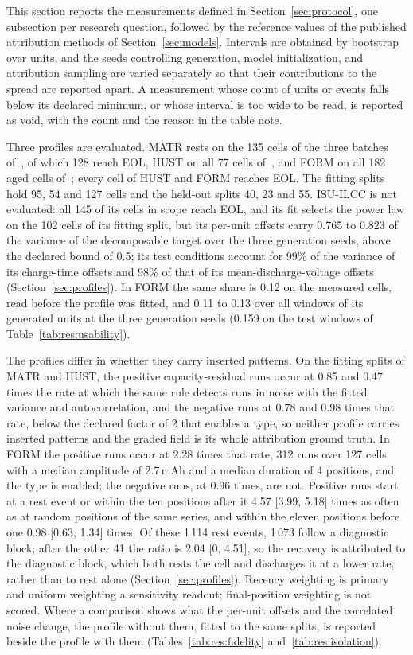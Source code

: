 \documentclass{article}
\begin{document}
This section reports the measurements defined in Section~\ref{sec:protocol}, one subsection per research question, followed by the reference values of the published attribution methods of Section~\ref{sec:models}. Intervals are obtained by bootstrap over units, and the seeds controlling generation, model initialization, and attribution sampling are varied separately so that their contributions to the spread are reported apart. A measurement whose count of units or events falls below its declared minimum, or whose interval is too wide to be read, is reported as void, with the count and the reason in the table note.

Three profiles are evaluated. MATR rests on the 135 cells of the three batches of~\cite{severson2019}, of which 128 reach EOL, HUST on all 77 cells of~\cite{ma2022hust}, and FORM on all 182 aged cells of~\cite{cui2024formation}; every cell of HUST and FORM reaches EOL. The fitting splits hold 95, 54 and 127 cells and the held-out splits 40, 23 and 55. ISU-ILCC is not evaluated: all 145 of its cells in scope reach EOL, and its fit selects the power law on the 102 cells of its fitting split, but its per-unit offsets carry 0.765 to 0.823 of the variance of the decomposable target over the three generation seeds, above the declared bound of 0.5; its test conditions account for 99\% of the variance of its charge-time offsets and 98\% of that of its mean-discharge-voltage offsets (Section~\ref{sec:profiles}). In FORM the same share is 0.12 on the measured cells, read before the profile was fitted, and 0.11 to 0.13 over all windows of its generated units at the three generation seeds (0.159 on the test windows of Table~\ref{tab:res:usability}).

The profiles differ in whether they carry inserted patterns. On the fitting splits of MATR and HUST, the positive capacity-residual runs occur at 0.85 and 0.47 times the rate at which the same rule detects runs in noise with the fitted variance and autocorrelation, and the negative runs at 0.78 and 0.98 times that rate, below the declared factor of 2 that enables a type, so neither profile carries inserted patterns and the graded field is its whole attribution ground truth. In FORM the positive runs occur at 2.28 times that rate, 312 runs over 127 cells with a median amplitude of 2.7\,mAh and a median duration of 4 positions, and the type is enabled; the negative runs, at 0.96 times, are not. Positive runs start at a rest event or within the ten positions after it 4.57 [3.99, 5.18] times as often as at random positions of the same series, and within the eleven positions before one 0.98 [0.63, 1.34] times. Of these 1\,114 rest events, 1\,073 follow a diagnostic block; after the other 41 the ratio is 2.04 [0, 4.51], so the recovery is attributed to the diagnostic block, which both rests the cell and discharges it at a lower rate, rather than to rest alone (Section~\ref{sec:profiles}). Recency weighting is primary and uniform weighting a sensitivity readout; final-position weighting is not scored. Where a comparison shows what the per-unit offsets and the correlated noise change, the profile without them, fitted to the same splits, is reported beside the profile with them (Tables~\ref{tab:res:fidelity} and~\ref{tab:res:isolation}).
\end{document}
